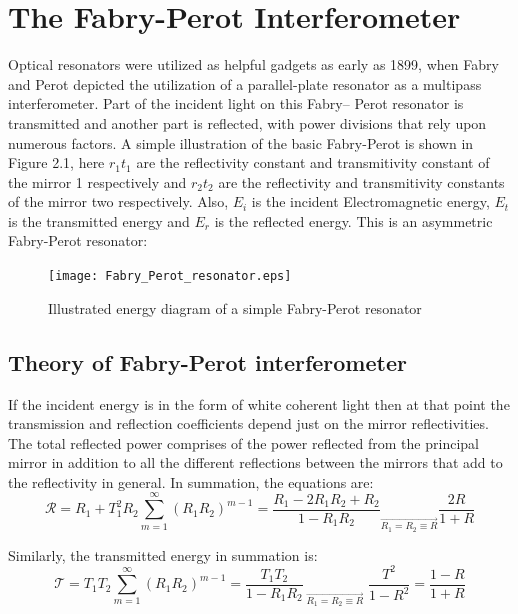 \section{The Fabry-Perot Interferometer}
Optical resonators were utilized as helpful gadgets as early as 1899, when Fabry and Perot depicted the utilization of a parallel-plate resonator as a multipass interferometer. Part of the incident light on this Fabry– Perot resonator is transmitted and another part is reflected, with power divisions that rely upon numerous factors. A simple illustration of the basic Fabry-Perot is shown in Figure 2.1, here $r_{1} t_{1}$ are the reflectivity constant and transmitivity constant of the mirror 1 respectively and $r_{2} t_{2}$ are the reflectivity and transmitivity constants of the mirror two respectively. Also, $E_{i}$ is the incident Electromagnetic energy, $E_{t}$ is the transmitted energy and $E_{r}$ is the reflected energy. This is an asymmetric Fabry-Perot resonator:

\begin{figure}[h]
\centering
\texttt{[image: Fabry\_Perot\_resonator.eps]}
\caption{Illustrated energy diagram of a simple Fabry-Perot resonator}
\end{figure}

\newpage

\subsection{Theory of Fabry-Perot interferometer}
 If the incident energy is in the form of white coherent light then at that point the transmission and reflection coefficients depend just on the mirror reflectivities. The total reflected power comprises of the power reflected from the principal mirror in addition to all the different reflections between the mirrors that add to the reflectivity in general. In summation, the equations are: 
\begin{equation}
{\mathcal R} = R_{1} + T_{1}^2 R_{2} \sum_{m=1}^{\infty} (R_{1}R_{2})^{m-1} = \frac{R_{1} - 2R_{1}R_{2} + R_{2}}{1 - R_{1}R_{2}} _{\overrightarrow{R_{1} = R_{2} \equiv R}} \frac{2R}{1+R}
\end{equation}

Similarly, the transmitted energy in summation is:
\begin{equation}
{\mathcal T} = T_{1} T_{2} \sum_{m=1}^{\infty} (R_{1}R_{2})^{m-1} = \frac{T_{1} T_{2}}{1 - R_{1}R_{2}} _{\; \overrightarrow{R_{1} = R_{2} \equiv R}} \; \frac{T^{2}}{1-R^{2}} = \frac{1-R}{1+R}
\end{equation}

